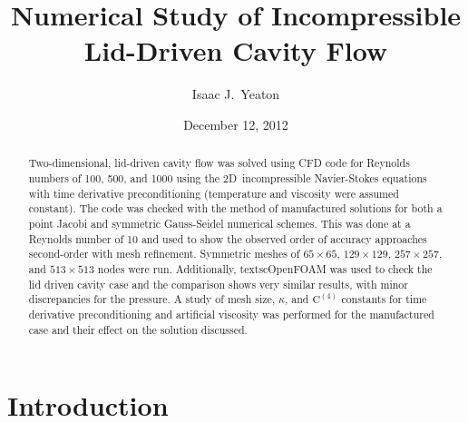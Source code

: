 \documentclass[10pt, letterpaper]{article}
\title{Numerical Study of Incompressible Lid-Driven Cavity Flow}
\author{Isaac J.~Yeaton}
\date{December 12, 2012}
\newcommand{\mesh}[1]{${#1} \times {#1}$}
\begin{document}
\maketitle
\thispagestyle{empty}


\begin{abstract}
	Two-dimensional, lid-driven cavity flow was solved using CFD code for 
	Reynolds numbers
	of 100, 500, and 1000 using the 2D~incompressible Navier-Stokes equations
	with time derivative preconditioning (temperature and viscosity were assumed
	constant).  The code was checked with the method of manufactured solutions
	for both a point Jacobi and symmetric Gauss-Seidel numerical schemes.  This
	was done at a Reynolds number of 10 and used to show the observed order of
	accuracy approaches second-order with mesh refinement.  Symmetric meshes
	of \mesh{65}, \mesh{129}, \mesh{257}, and \mesh{513} nodes were run. 
	Additionally, textsc{OpenFOAM} was used to check the lid driven cavity case
	and the comparison shows very similar results, with minor discrepancies
	for the pressure.  A study of mesh size, $\kappa$, and 
	$\mathrm{C^{(4)}}$ constants
	for time derivative preconditioning and artificial viscosity was performed for 
	the manufactured case and their effect on the solution	discussed.
\end{abstract}


\section{Introduction}
\end{document}
